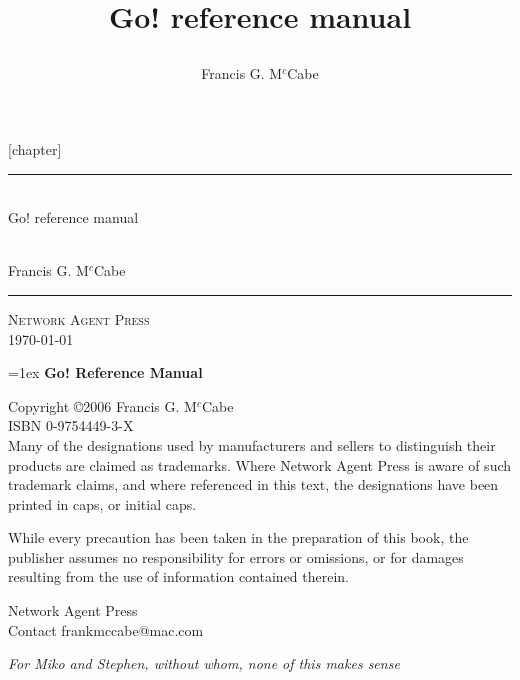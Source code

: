 \documentclass[fleqn,11pt,openright,draft]{book}
\title{\Huge Go! reference manual\\
\large

}
\author{Francis G. M$^c$Cabe}
\newcommand{\go}{{Go!}\xspace}
\begin{document}
[chapter]

\frontmatter
\thispagestyle{empty}
\newcommand{\HRule}{\rule{\linewidth}{1mm}}
\begin{flushright}
\HRule
\\
\Huge Go! reference manual\\
\large

\\[1ex]
\huge Francis G. M$^c$Cabe
\HRule
\end{flushright}
\begin{center}
\Large\textsc{Network Agent Press\\
\today}
\end{center}
\newpage{}
\thispagestyle{empty}
{
\parindent=0in
\parskip=1ex
{\bf\large \go Reference Manual}

Copyright \copyright 2006 Francis G. M$^c$Cabe\\
ISBN 0-9754449-3-X\\

Many of the designations used by manufacturers and sellers to distinguish their products are claimed as trademarks. Where Network Agent Press is aware of such trademark claims, and where referenced in this text, the designations have been printed in caps, or initial caps.

While every precaution has been taken in the preparation of this book, the publisher assumes no responsibility for errors or omissions, or for damages resulting from the use of information contained therein.

\vspace*{4ex}
Network Agent Press\\
Contact frankmccabe@mac.com\\
}

\newpage{}
\thispagestyle{empty}
\begin{center}
\emph{For Miko and Stephen, without whom, none of this makes sense}
\end{center}
\cleardoublepage

\pagestyle{fancy}
\renewcommand{\chaptermark}[1]{\markboth{\thechapter\ #1}{}} \renewcommand{\sectionmark}[1]{\markright{\thesection\ #1}}
\fancyhf{} %
\fancyhead[LE,RO]{\bfseries\thepage}
\fancyhead[LO]{\bfseries\rightmark}
\fancyhead[RE]{\bfseries\leftmark}
\renewcommand{\headrulewidth}{0.5pt}
\renewcommand{\footrulewidth}{0pt}
\addtolength{\headheight}{0.5pt} %
\end{document}
